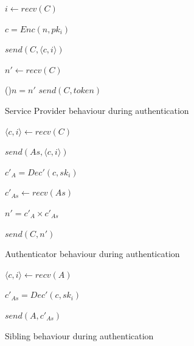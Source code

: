 \begin{algorithm}
    \BlankLine
    \BlankLine
 
    $i \leftarrow recv(C)$
    
    $c = Enc(n,pk_i)$
    \BlankLine
 
    $send(C,\langle c, i \rangle)$
    
    $n' \leftarrow recv(C)$
    \BlankLine
    
    \If(){$n = n'$}{
        $send(C, token)$
    }
    \BlankLine

 \caption{Service Provider behaviour during authentication}
 \label{alg:servAuth}
\end{algorithm}

\begin{algorithm}
    \BlankLine
    \BlankLine
 
    $\langle c,i \rangle \leftarrow recv(C)$
    
    $send(As, \langle c, i \rangle)$
    \BlankLine
    
    $c'_{A} = Dec'(c,sk_{i})$
    
    $c'_{As} \leftarrow recv(As)$
    \BlankLine
    
    $n' = c'_{A} \times c'_{As}$
    
    $send(C, n')$ 
    \BlankLine
    
 \caption{Authenticator behaviour during authentication}
 \label{alg:authAuth}
\end{algorithm}

\begin{algorithm}
    \BlankLine
    \BlankLine
 
    $\langle c,i \rangle \leftarrow recv(A)$
    
    $c'_{As} = Dec'(c,sk_{i})$
    
    $send(A, c'_{As})$
    \BlankLine
    
 \caption{Sibling behaviour during authentication}
 \label{alg:sibAuth}
\end{algorithm}

